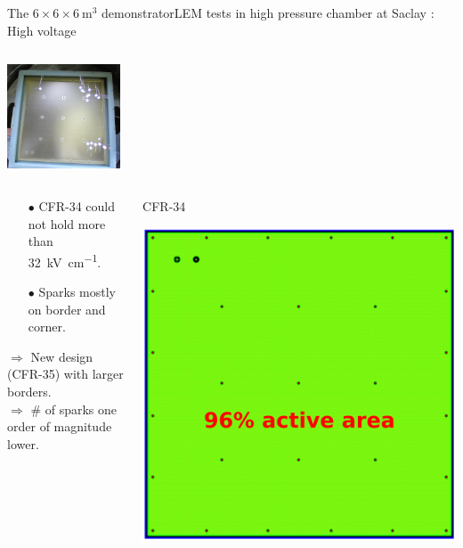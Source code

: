 \documentclass[10pt]{beamer}
\begin{document}
\begin{frame}{The \texorpdfstring{$6 \times 6 \times \SI{6}{\meter\cubed}$}{666} demonstrator}{LEM tests in high pressure chamber at Saclay : High voltage}
\begin{columns}
\begin{column}{0.5\textwidth}
\begin{center}
	    			\includegraphics[height=3.1cm]{figures/666/sparks_35.png}
	    		\end{center}
    		\end{column}
    	\end{columns}\vspace{0.1cm}
    	\begin{columns}
    		\begin{column}{0.5\textwidth}
    			\begin{scriptsize}
	    			\begin{itemize}
	    				\item[$\bullet$] CFR-34 could not hold more than \SI{32}{\kilo\volt\per\centi\meter}.
	    				\item[$\bullet$] Sparks mostly on border and corner.
	    			\end{itemize}
	    			$\Rightarrow$ New design (CFR-35) with larger borders.\\
	    			$\Rightarrow$ \# of sparks one order of magnitude lower.
	    		\end{scriptsize}
    		\end{column}\hfill
    		\begin{column}{0.5\textwidth}
    			\begin{minipage}{0.48\textwidth}
    				\centering
    				\begin{scriptsize}
	    				CFR-34
	    			\end{scriptsize}
    				\includegraphics[width=.9\textwidth]{figures/666/CFR-34.png}

\end{minipage}
\end{column}
\end{columns}
\end{frame}
\end{document}
